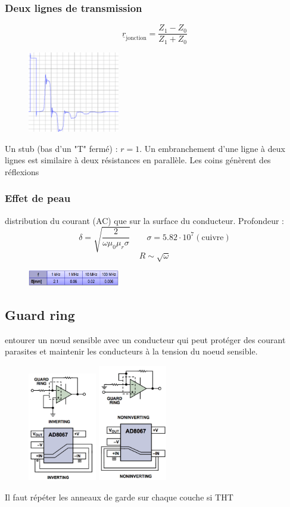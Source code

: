 \documentclass[resume]{subfiles}
\begin{document}
\begin{multicols}{3}
\subsubsection{Deux lignes de transmission}
$$\underline{r}_{\text{jonction}}=\frac{Z_1-Z_0}{Z_1+Z_0}$$
\begin{figure}[H]
\centering
\includegraphics[width=4.00cm]{img_14.png}
\end{figure}
Un stub (bas d'un "T" fermé) : $r=1$. Un embranchement d'une ligne à deux lignes est similaire à deux résistances en parallèle. Les coins génèrent des réflexions
\subsubsection{Effet de peau}
distribution du courant (AC) que sur la surface du conducteur. Profondeur : 
$$\delta = \sqrt{\frac{2}{\omega \mu_0 \mu_r \sigma}} \qquad \sigma = 5.82\cdot 10^{7}(\text{cuivre})$$
$$R\sim \sqrt{\omega}$$
\begin{figure}[H]
\centering
\includegraphics[width=4.00cm]{img_17.png} 
\end{figure}
\subsection{Guard ring}
entourer un nœud sensible avec un conducteur qui peut protéger des courant parasites et maintenir les conducteurs à la tension du noeud sensible. \\
\begin{figure}[H]
\centering
\includegraphics[width=3.00cm]{img_18.png}
\includegraphics[width=3.00cm]{img_19.png}
\end{figure}
Il faut répéter les anneaux de garde sur chaque couche si THT

\end{multicols}
\end{document}
